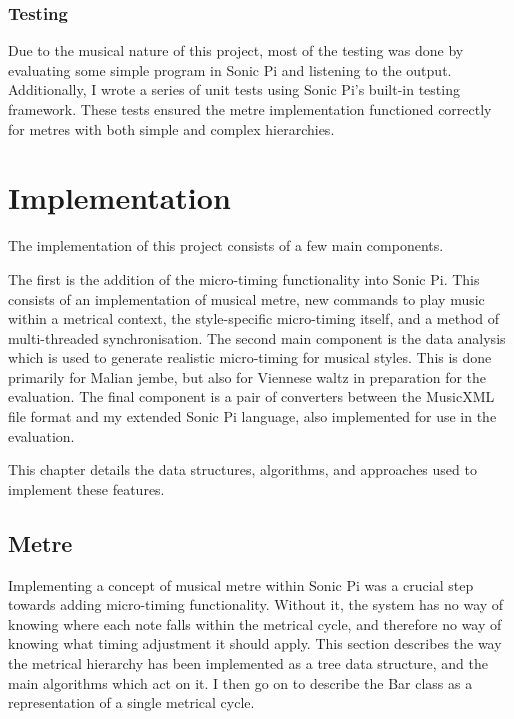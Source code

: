 \documentclass[12pt,twoside,openright]{report}
\begin{document}
\subsection{Testing}

Due to the musical nature of this project, most of the testing was done by
evaluating some simple program in Sonic Pi and listening to the output.
Additionally, I wrote a series of unit tests using Sonic Pi's built-in testing
framework. These tests ensured the metre implementation functioned correctly for
metres with both simple and complex hierarchies.





\chapter{Implementation} \label{implementation}

The implementation of this project consists of a few main components.

The first is the addition of the micro-timing functionality into Sonic Pi.
This consists of an implementation of musical metre, new commands to play music
within a metrical context, the style-specific micro-timing itself, and a method
of multi-threaded synchronisation. The second main component is the data
analysis which is used to generate realistic micro-timing for musical styles.
This is done primarily for Malian jembe, but also for Viennese waltz in
preparation for the evaluation. The final component is a pair of converters
between the MusicXML file format and my extended Sonic Pi language, also
implemented for use in the evaluation.

This chapter details the data structures, algorithms, and approaches used to
implement these features.



\section{Metre} \label{metre_implementation}

Implementing a concept of musical metre within Sonic Pi was a crucial step
towards adding micro-timing functionality. Without it, the system has no way of
knowing where each note falls within the metrical cycle, and therefore no way of
knowing what timing adjustment it should apply. This section describes the way
the metrical hierarchy has been implemented as a tree data structure, and the
main algorithms which act on it. I then go on to describe the Bar class as a
representation of a single metrical cycle.
\end{document}

